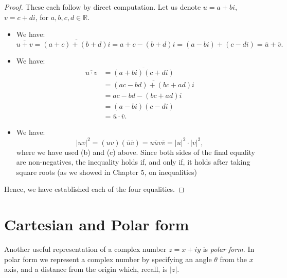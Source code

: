 \documentclass[11pt,dvipsnames]{book}
\numberwithin{figure}{section} %
\numberwithin{table}{section} %
\begin{document}
\begin{solution}

\begin{proof}
These each follow by direct computation.  Let us denote $u=a+bi$, $v=c+di$, for $a,b,c,d\in\mathbb{R}$.
\begin{itemize}
\item We have:
$$\overline{u+v} = \overline{(a+c) + (b+d)i} = a+c - (b+d)i = (a-bi) + (c-di) = \overline{u} + \overline{v}.$$
\item We have:
\begin{align*}
\overline{u\cdot v}
& = \overline{(a+bi)(c+di)}\\
&  = \overline{(ac-bd) + (bc+ad)i} \\
& = ac-bd - (bc+ad)i \\
& = (a-bi)(c-di) \\
& = \overline{u}\cdot\overline{v}.
\end{align*}

\item We have:
$$|uv|^2 = (uv)(\overline{u}\overline{v}) = u\overline{u}v\overline{v} = |u|^2\cdot|v|^2,$$
where we have used (b) and (c) above.  Since both sides of the final equality are non-negatives, the inequality holds if, and only if, it holds after taking square roots (as we showed in Chapter 5, on inequalities)
\end{itemize}
Hence, we have established each of the four equalities.\end{proof}
\end{solution}

\section{Cartesian and Polar form}%
\label{cartesianandpolar}

Another useful representation of a complex number \(z=x+iy\) is {\it polar form}.  In polar form we represent a complex number by specifying an angle $\theta$ from the $x$ axis, and a distance from the origin which, recall, is $|z|$.
\end{document}
